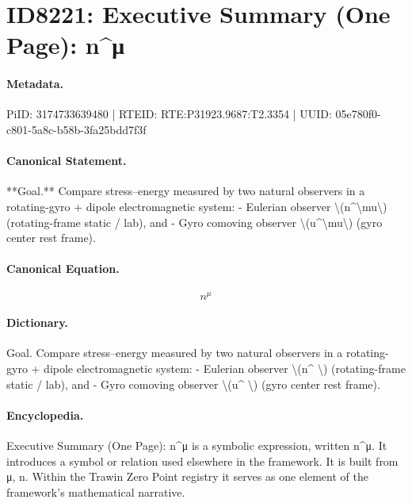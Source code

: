 \section*{ID8221: Executive Summary (One Page): n\textasciicircum{}μ}
\paragraph{Metadata.}
PiID: 3174733639480 | RTEID: RTE:P31923.9687:T2.3354 | UUID: 05e780f0-c801-5a8c-b58b-3fa25bdd7f3f

\paragraph{Canonical Statement.}
**Goal.** Compare stress–energy measured by two natural observers in a rotating-gyro + dipole electromagnetic system: - Eulerian observer \textbackslash{}(n\textasciicircum{}\textbackslash{}mu\textbackslash{}) (rotating-frame static / lab), and - Gyro comoving observer \textbackslash{}(u\textasciicircum{}\textbackslash{}mu\textbackslash{}) (gyro center rest frame).

\paragraph{Canonical Equation.}
\[
n^\mu
\]

\paragraph{Dictionary.}
Goal. Compare stress–energy measured by two natural observers in a rotating-gyro + dipole electromagnetic system: - Eulerian observer \textbackslash{}(n\textasciicircum{} \textbackslash{}) (rotating-frame static / lab), and - Gyro comoving observer \textbackslash{}(u\textasciicircum{} \textbackslash{}) (gyro center rest frame).

\paragraph{Encyclopedia.}
Executive Summary (One Page): n\textasciicircum{}μ is a symbolic expression, written n\textasciicircum{}μ. It introduces a symbol or relation used elsewhere in the framework. It is built from μ, n. Within the Trawin Zero Point registry it serves as one element of the framework's mathematical narrative.
